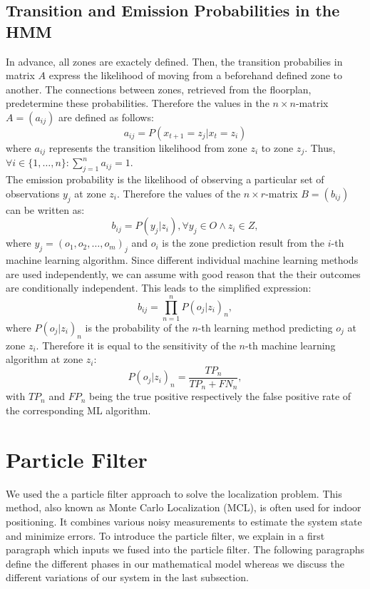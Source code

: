 \subsection{Transition and Emission Probabilities in the HMM}
In advance, all zones are exactely defined. Then, the transition probabilies in matrix $A$ express the likelihood of moving from a beforehand defined zone to another. The connections between zones, retrieved from the floorplan, predetermine these probabilities. Therefore the values in the $n\times n$-matrix $A = (a_{ij})$ are defined as follows:
$$a_{ij} = P(x_{t+1} = z_{j} | x_{t} = z_{i})$$
where $a_{ij}$ represents the transition likelihood from zone $z_{i}$ to zone $z_{j}$. Thus, $\forall i \in \{1,\dots,n\}: \sum_{j=1}^{n} a_{ij} = 1$.\\
The emission probability is the likelihood of observing a particular set of observations $y_{j}$ at zone $z_{i}$. Therefore the values of the $n\times r$-matrix $B = (b_{ij})$ can be written as:
$$b_{ij} = P(y_{j} | z_{i}), \forall y_{j} \in O \land z_{i} \in Z,$$
where $y_{j} = (o_1, o_2, \dots, o_m)_j$ and $o_i$ is the zone prediction result from the $i$-th machine learning algorithm.
Since different individual machine learning methods are used independently, we can assume with good reason that the their outcomes are conditionally independent. This leads to the simplified expression:
$$b_{ij} = \prod^{n}_{n=1} P(o_{j} | z_{i})_{n},$$
where $P(o_{j} | z_{i})_{n}$ is the probability of the $n$-th learning method predicting $o_{j}$ at zone $z_{i}$. Therefore it is equal to the sensitivity of the $n$-th machine learning algorithm at zone $z_{i}$:
$$P(o_{j} | z_{i})_{n} = \frac{TP_{n}}{TP_{n} + FN_{n}},$$
with $TP_{n}$ and $FP_{n}$ being the true positive respectively the false positive rate of the corresponding ML algorithm.



\section{Particle Filter}
We used the a particle filter approach to solve the localization problem. This method, also known as Monte Carlo Localization (MCL), is often used for indoor positioning. It combines various noisy measurements to estimate the system state and minimize errors. To introduce the particle filter, we explain in a first paragraph which inputs we fused into the particle filter. The following paragraphs define the different phases in our mathematical model whereas we discuss the different variations of our system in the last subsection.

